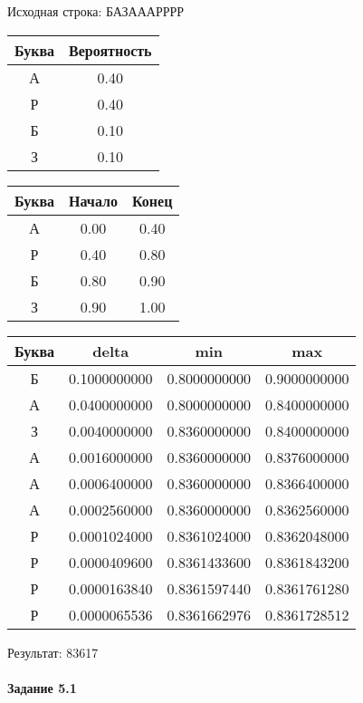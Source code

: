 \documentclass[a4paper, 12pt]{article}
\begin{document}
Исходная строка: БАЗАААРРРР\
\begin{center}
 \begin{tabular}{ |c|c| } 
  \hline
     Буква & Вероятность \\ \hline
А & 0.40\\\hline
Р & 0.40\\\hline
Б & 0.10\\\hline
З & 0.10
\\ \hline \end{tabular}
\end{center}
\begin{center}
 \begin{tabular}{ |c|c|c| } 
  \hline
     Буква & Начало & Конец \\ \hline
А & 0.00 & 0.40\\\hline
Р & 0.40 & 0.80\\\hline
Б & 0.80 & 0.90\\\hline
З & 0.90 & 1.00
\\ \hline \end{tabular}
\end{center}
\begin{center}
 \begin{tabular}{ |c|c|c|c| } 
  \hline
     Буква & delta & min & max \\ \hline
Б & 0.1000000000 & 0.8000000000 & 0.9000000000\\\hline
А & 0.0400000000 & 0.8000000000 & 0.8400000000\\\hline
З & 0.0040000000 & 0.8360000000 & 0.8400000000\\\hline
А & 0.0016000000 & 0.8360000000 & 0.8376000000\\\hline
А & 0.0006400000 & 0.8360000000 & 0.8366400000\\\hline
А & 0.0002560000 & 0.8360000000 & 0.8362560000\\\hline
Р & 0.0001024000 & 0.8361024000 & 0.8362048000\\\hline
Р & 0.0000409600 & 0.8361433600 & 0.8361843200\\\hline
Р & 0.0000163840 & 0.8361597440 & 0.8361761280\\\hline
Р & 0.0000065536 & 0.8361662976 & 0.8361728512
\\ \hline \end{tabular}
\end{center}
Результат: 83617
\pagebreak
\paragraph{Задание 5.1 \\
}
\end{document}
